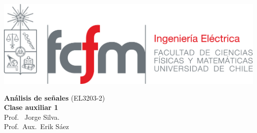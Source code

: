 \documentclass[
  11pt,
  letterpaper,
   addpoints,
   answers
  ]{exam}
\begin{document}
\noindent
\begin{minipage}{0.47\textwidth}
\includegraphics[width=\textwidth]{../fcfm_die}
\end{minipage}
\begin{minipage}{0.53\textwidth}
\begin{center} 
\large\textbf{Análisis de señales} (EL3203-2) \\
\large\textbf{Clase auxiliar 1} \\
\normalsize Prof.~ Jorge Silva.\\
\normalsize Prof.~Aux.~Erik Sáez
\end{center}
\end{minipage}

\vspace{0.5cm}
\noindent
\vspace{.85cm}
\end{document}
